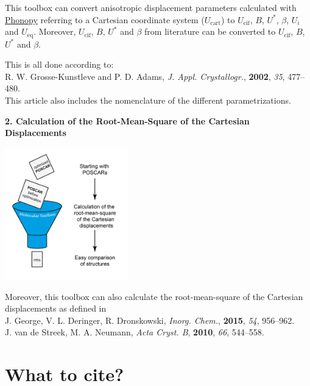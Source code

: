 \documentclass[12pt,a4paper]{article}
\begin{document}
This toolbox can convert anisotropic displacement parameters calculated with \href{http://phonopy.sourceforge.net/}{Phonopy} referring to a Cartesian coordinate system ($U_{\mathrm{cart}}$) to $U_{\mathrm{cif}}$, $B$, $U^\mathrm{*}$, $\beta$, $U_{i}$ and $U_{\mathrm{eq}}$. Moreover, $U_{\mathrm{cif}}$, $B$, $U^\mathrm{*}$ and $\beta$ from literature can be converted to $U_{\mathrm{cif}}$, $B$, $U^\mathrm{*}$ and $\beta$. 

This is all done according to:\\ R. W. Grosse-Kunstleve and P. D. Adams, \textit{J. Appl. Crystallogr.}, \textbf{2002}, \textit{35}, 477–480.\\ This article also includes the nomenclature of the different parametrizations.

\textbf{2. Calculation of the Root-Mean-Square of the Cartesian Displacements}\\

\begin{center}\includegraphics[width=0.4\textwidth]{Piktogramm-02.png}\end{center}
Moreover, this toolbox can also calculate the root-mean-square of the Cartesian displacements as defined in\\ J. George, V. L. Deringer, R. Dronskowski, \textit{Inorg. Chem.}, \textbf{2015}, \textit{54}, 956–962.\\   J. van de Streek, M. A. Neumann,  \textit{Acta Cryst. B}, \textbf{2010}, \textit{66},  544–558.



\newpage
\section{What to cite?}
\end{document}
